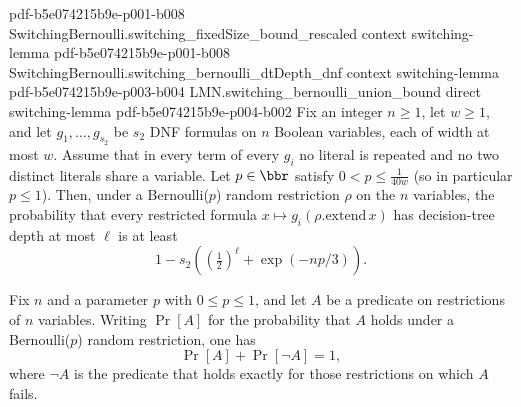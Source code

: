 \begin{theorem}
  {pdf-b5e074215b9e-p001-b008}
\proofstep
  {SwitchingBernoulli.switching_fixedSize_bound_rescaled}
  {context}
  {switching-lemma}
  {pdf-b5e074215b9e-p001-b008}
\proofstep
  {SwitchingBernoulli.switching_bernoulli_dtDepth_dnf}
  {context}
  {switching-lemma}
  {pdf-b5e074215b9e-p003-b004}
\proofstep
  {LMN.switching_bernoulli_union_bound}
  {direct}
  {switching-lemma}
  {pdf-b5e074215b9e-p004-b002}
Fix an integer $n \ge 1$, let $w \ge 1$, and let $g_1, \dots, g_{s_2}$ be $s_2$ DNF
formulas on $n$ Boolean variables, each of width at most $w$. Assume that in every term
of every $g_i$ no literal is repeated and no two distinct literals share a variable. Let
$p \in \bbr$ satisfy $0 < p \le \tfrac{1}{40w}$ (so in particular $p \le 1$). Then,
under a Bernoulli($p$) random restriction $\rho$ on the $n$ variables, the probability
that every restricted formula $x \mapsto g_i(\rho.\mathrm{extend}\,x)$ has decision-tree
depth at most $\ell$ is at least
\[
  1 - s_2\left( \left(\tfrac{1}{2}\right)^{\ell} + \exp\!\left(-np/3\right) \right).
\]
\end{theorem}

\begin{lemma}
\label{LMN.bernoulliRestrProb_complement}
\leanok
{}
Fix $n$ and a parameter $p$ with $0 \le p \le 1$, and let $A$ be a predicate on
restrictions of $n$ variables. Writing $\Pr[A]$ for the probability that $A$ holds under
a Bernoulli($p$) random restriction, one has
\[
  \Pr[A] + \Pr[\neg A] = 1,
\]
where $\neg A$ is the predicate that holds exactly for those restrictions on which $A$
fails.
\end{lemma}

